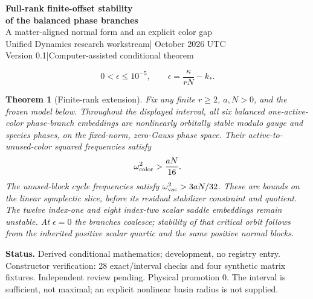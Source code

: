 \documentclass[11pt,a4paper]{article}
\newtheorem{theorem}{Theorem}\newtheorem{lemma}[theorem]{Lemma}
\begin{document}
\begin{center}
{\Large\bfseries Full-rank finite-offset stability\\of the balanced phase branches}\\[10pt]
{\large A matter-aligned normal form and an explicit color gap}\\[10pt]
Unified Dynamics research workstream\quad | October 2026 UTC\\
Version 0.1\quad |\quad Computer-assisted conditional theorem
\end{center}
\begin{abstract}
The preceding finite-offset certificate continued 26 labeled stationary phase branches but left the stability of their higher-rank embeddings open. We close that gap on the same sufficient interval. A local gauge aligns the sum of the two conjugately represented matter fields; their mixed color--matter quadratic term then cancels exactly, including at nonzero offset. A two-color determinant identity bounds the magnetic correction by the small diamond phase. The resulting normal energy is uniformly positive for every finite rank. Gauss reduction supplies an explicit lower bound on color-normal frequencies. Together with the inherited scalar minimum and unused-block vacuum minimum, this proves nonlinear orbital stability of the six balanced embeddings. The other twenty embeddings retain their scalar instabilities. All statements concern the frozen candidate Hamiltonian; none is a physical correspondence or empirical result.
\end{abstract}
\[
\boxed{0<\epsilon\le10^{-5},\qquad \epsilon=\frac\kappa{rN}-k_*.}
\]
\begin{theorem}[Finite-rank extension]\label{th:main}
Fix any finite $r\ge2$, $a,N>0$, and the frozen model below. Throughout the displayed interval, all six balanced one-active-color phase-branch embeddings are nonlinearly orbitally stable modulo gauge and species phases, on the fixed-norm, zero-Gauss phase space. Their active-to-unused-color squared frequencies satisfy
\[
\omega_{\rm color}^2>\frac{aN}{16}.
\]
The unused-block cycle frequencies satisfy $\omega_{\rm vac}^2>3aN/32$. These are bounds on the linear symplectic slice, before its residual stabilizer constraint and quotient. The twelve index-one and eight index-two scalar saddle embeddings remain unstable. At $\epsilon=0$ the branches coalesce; stability of that critical orbit follows from the inherited positive scalar quartic and the same positive normal blocks.
\end{theorem}
\textbf{Status.} Derived conditional mathematics; development, no registry entry. Constructor verification: 28 exact/interval checks and four synthetic matrix fixtures. Independent review pending. Physical promotion $0$. The interval is sufficient, not maximal; an explicit nonlinear basin radius is not supplied.
\newpage
\end{document}
